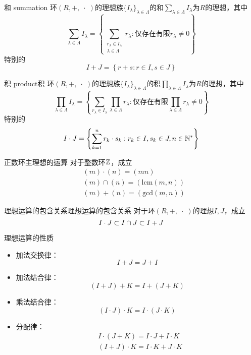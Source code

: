 \begin{definition}{和 summation}
	环$(R,+,\;\cdot\;)$的理想族$\{I_\lambda\}_{\lambda\in\Lambda}$的和$\displaystyle \sum_{\lambda\in\Lambda}I_\lambda$为$R$的理想，其中
	$$
	\sum_{\lambda\in\Lambda}I_\lambda=\left\{ \sum_{\substack{r_\lambda \in I_\lambda\\\lambda\in\Lambda}}r_\lambda:\text{仅存在有限}r_\lambda\ne 0  \right\}
	$$
	特别的
	$$
	I+J=\left\{ r+s:r\in I,s\in J \right\}
	$$
\end{definition}

\begin{definition}{积 product}{积}
	环$(R,+,\;\cdot\;)$的理想族$\{I_\lambda\}_{\lambda\in\Lambda}$的积$\displaystyle \prod_{\lambda\in\Lambda}I_\lambda$为$R$的理想，其中
	$$
	\prod_{\lambda\in\Lambda}I_\lambda=\left\{ \sum_{r_\lambda\in I_\lambda}\prod_{\lambda\in\Lambda}r_\lambda:\text{仅存在有限}\prod_{\lambda\in\Lambda}r_\lambda\ne0 \right\}
	$$
	特别的
	$$
	I\cdot J=\left\{ \sum_{k=1}^{n}r_k\cdot s_k:r_k\in I,s_k\in J,n\in\mathbb{N}^* \right\}
	$$
\end{definition}

\begin{proposition}{正数环主理想的运算}
	对于整数环$\mathbb{Z}$，成立
	\begin{align*}
		&(m)\cdot (n)=(mn)\\
		&(m)\cap (n)=(\mathrm{lcm}(m,n))\\
		&(m)+(n)=(\mathrm{gcd}(m,n))
	\end{align*}
\end{proposition}

\begin{proposition}{理想运算的包含关系}{理想运算的包含关系}
	对于环$(R,+,\;\cdot\;)$的理想$I,J$，成立
	$$
	I\cdot J\subset I\cap J\subset I+J
	$$
\end{proposition}

\begin{proposition}{理想运算的性质}
	\begin{itemize}
		\item 加法交换律：
		$$
		I+J=J+I
		$$
		\item 加法结合律：
		$$
		(I+J)+K=I+(J+K)
		$$
		\item 乘法结合律：
		$$
		(I\cdot J)\cdot K=I\cdot (J\cdot K)
		$$
		\item 分配律：
		\begin{align*}
			&I\cdot (J+K)=I\cdot J+I\cdot K\\
			&(I+J)\cdot K=I\cdot K+J\cdot K
		\end{align*}
	\end{itemize}
\end{proposition}

